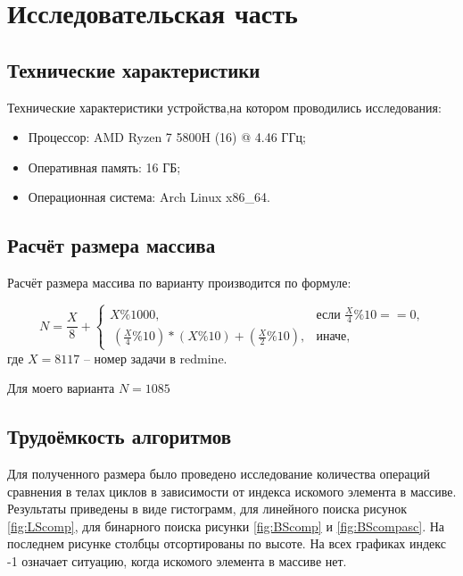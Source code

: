 \chapter{Исследовательская часть}

\section{Технические характеристики}

Технические характеристики устройства,на котором проводились исследования:

\begin{itemize}
	\item Процессор: AMD Ryzen 7 5800H (16) @ 4.46 ГГц;
	\item Оперативная память: 16 ГБ;
	\item Операционная система: Arch Linux x86\_64.
\end{itemize}

\section{Расчёт размера массива}

Расчёт размера массива по варианту производится по формуле:

\begin{equation}
	\label{variant}
	N = \frac{X}{8} + \begin{cases}
		X \% 1000,  &\text{если $\frac{X}{4} \% 10 == 0$,} \\
		\ (\frac{X}{4} \% 10) * (X \% 10) + (\frac{X}{2} \% 10), &\text{иначе},
	\end{cases}
\end{equation}
где $X = 8117$ – номер задачи в redmine.

Для моего варианта $N = 1085$


\section{Трудоёмкость алгоритмов}
Для полученного размера было проведено исследование количества операций сравнения в телах циклов в зависимости от индекса искомого элемента в массиве. Результаты приведены в виде гистограмм, для линейного поиска рисунок \ref{fig:LScomp}, для бинарного поиска рисунки \ref{fig:BScomp} и \ref{fig:BScompasc}. На последнем рисунке столбцы отсортированы по высоте. На всех графиках индекс -1 означает ситуацию, когда искомого элемента в массиве нет.



